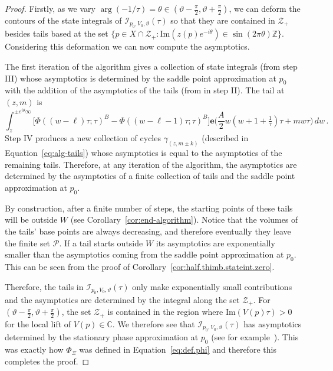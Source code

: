 \documentclass[12pt,reqno]{amsart}
\theoremstyle{definition}
\def\BZ{\mathbb Z}
\def\BC{\mathbb C}
\def\calI{\mathcal I}
\def\calP{\mathcal P}
\def\calZ{\mathcal Z}
\def\Im{\mathrm{Im}}
\def\be{\begin{equation}}
\def\ee{\end{equation}}
\def\e{\mathbf e}
\renewcommand{\=}{\;=\;}
\begin{document}
\begin{proof}
Firstly, as we vary $\arg(-1/\tau)=\theta\in(\vartheta-\tfrac{\pi}{2},\vartheta+\tfrac{\pi}{2})$, we can deform the contours of the state integrals of $\calI_{p_0,V_0,\vartheta}(\tau)$ so that they are contained in $\calZ_{+}$ besides tails based at the set $\{p\in X\cap\calZ_+ \colon \Im(z(p)e^{-i\theta})\in\sin(2\pi\theta)\BZ\}$. Considering this deformation we can now compute the asymptotics.

\medskip

The first iteration of the algorithm gives a collection of state integrals (from step III) whose asymptotics is determined by the saddle point approximation at $p_0$ with the addition of the asymptotics of the tails (from in step II). The tail at $(z,m)$ is 
\be\label{eq:tail}
\int_{z}^{\pm e^{i\theta}\infty} \big[\Phi((w-\ell)\tau;\tau)^B-\Phi((w-\ell-1)\tau;\tau)^B\big] \e\Big(\frac{A}{2}w(w+1+\tfrac{1}{\tau})\tau+mw\tau\Big)\,dw\,.
\ee
Step IV produces a new collection of cycles $\gamma_{(z,m\pm k)}$ (described in Equation~\eqref{eq:alg-tails}) whose asymptotics is equal to the asymptotics of the remaining tails. Therefore, at any iteration of the algorithm, the asymptotics are determined by the asymptotics of a finite collection of tails and the saddle point approximation at $p_0$.

\medskip

By construction, after a finite number of steps, the starting points of these tails will be outside $W$ (see Corollary~\ref{cor:end-algorithm}). Notice that the volumes of the tails' base points are always decreasing, and therefore eventually they leave the finite set $\calP$. If a tail starts outside $W$ its asymptotics are exponentially smaller than the asymptotics coming from the saddle point approximation at $p_0$. This can be seen from the proof of Corollary~\ref{cor:half.thimb.stateint.zero}.

\medskip

Therefore, the tails in $\calI_{p_0,V_0,\vartheta}(\tau)$ only make exponentially small contributions and the asymptotics are determined by the integral along the set $\calZ_+$. For $(\vartheta-\tfrac{\pi}{2},\vartheta+\tfrac{\pi}{2})$, the set $\calZ_+$ is contained in the region where $\Im(V(p)\tau)>0$ for the local lift of $V(p)\in\BC$. We therefore see that $\calI_{p_0,V_0,\vartheta}(\tau)$ has asymptotics determined by the stationary phase approximation at $p_0$ (see for example~\cite[Chap.~9, Sec.~2.2, Theorem~2.1]{Olver}). This was exactly how $\Phi_{\Xi}$ was defined in Equation~\eqref{eq:def.phi} and therefore this completes the proof.
\end{proof}
\end{document}
